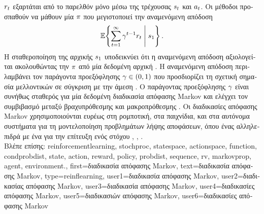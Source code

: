 {{		 $r_{t}$ \foreignlanguage{greek}{εξαρτάται από το παρελθόν μόνο μέσω της 
		τρέχουσας}  $s_{t}$ \foreignlanguage{greek}{και}  $a_{t}$. 
		\foreignlanguage{greek}{Οι μέθοδοι}  \foreignlanguage{greek}{προσπαθούν να 
		μάθουν μία}  $\pi$ \foreignlanguage{greek}{που μεγιστοποιεί την αναμενόμενη απόδοση}
		\[
			\mathbb{E}\!\left\{ 
			 \sum_{t=1}^{\infty} 
			 \gamma^{t-1} r_{t} 
			 \;\middle|\; s_{1} 
			 \right\}.
		\]
		\foreignlanguage{greek}{Η σταθεροποίηση της αρχικής}  $s_{1}$  
		\foreignlanguage{greek}{υποδεικνύει ότι η αναμενόμενη απόδοση αξιολογείται ακολουθώντας την} 
		 $\pi$ \foreignlanguage{greek}{από μία δεδομένη αρχική} .
		\foreignlanguage{greek}{Η αναμενόμενη απόδοση περιλαμβάνει τον παράγοντα προεξόφλησης 
		$\gamma \in (0,1)$ που προσδιορίζει τη σχετική σημασία μελλοντικών}  
		\foreignlanguage{greek}{σε σύγκριση με την άμεση} . 
		\foreignlanguage{greek}{Ο παράγοντας προεξόφλησης $\gamma$ είναι συνήθως σταθερός για μία δεδομένη 
		διαδικασία απόφασης} Markov \foreignlanguage{greek}{και ελέγχει τον συμβιβασμό μεταξύ βραχυπρόθεσμης 
		και μακροπρόθεσμης} . \foreignlanguage{greek}{Οι διαδικασίες απόφασης} Markov
		\foreignlanguage{greek}{χρησιμοποιούνται ευρέως στη ρομποτική, στα παιχνίδια, και στα αυτόνομα συστήματα 
		για τη μοντελοποίηση προβλημάτων λήψης αποφάσεων, όπου ένας}  \foreignlanguage{greek}{αλληλεπιδρά 
		με ένα}  \foreignlanguage{greek}{για την επίτευξη ενός στόχου} 
		\cite{SuttonEd2}, \cite{BertsekasDynOptII}, \cite{BertsekasDynProgVolI}.
		\\
		\foreignlanguage{greek}{Βλέπε επίσης:} \gls{reinforcementlearning}, \gls{stochproc}, \gls{statespace}, 
		\gls{actionspace}, \gls{function}, \gls{condprobdist}, \gls{state}, \gls{action}, \gls{reward}, \gls{policy}, \gls{probdist}, 
		\gls{sequence}, \gls{rv}, \gls{markovprop}, \gls{agent}, \gls{environment}.},
 	first={\foreignlanguage{greek}{διαδικασία απόφασης} Markov},
 	text={\foreignlanguage{greek}{διαδικασία απόφασης} Markov},
	type=reinflearning,
	user1={\foreignlanguage{greek}{διαδικασία απόφασης} Markov}, %
  	user2={\foreignlanguage{greek}{διαδικασίας απόφασης} Markov}, %
	user3={\foreignlanguage{greek}{διαδικασία απόφασης} Markov}, %
	user4={\foreignlanguage{greek}{διαδικασίες απόφασης} Markov}, %
  	user5={\foreignlanguage{greek}{διαδικασιών απόφασης} Markov}, %
	user6={\foreignlanguage{greek}{διαδικασίες απόφασης} Markov} %
}

